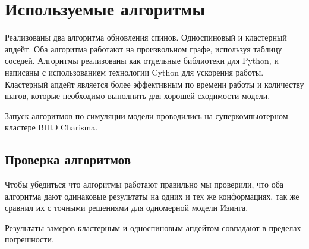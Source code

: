 \section{Используемые алгоритмы}

Реализованы два алгоритма обновления спинов. Односпиновый и кластерный апдейт. Оба алгоритма работают на произвольном графе, используя таблицу соседей. Алгоритмы реализованы как отдельные библиотеки для Python, и написаны с использованием технологии Cython для ускорения работы. Кластерный апдейт является более эффективным по времени работы и количеству шагов, которые необходимо выполнить для хорошей сходимости модели.

Запуск алгоритмов по симуляции модели проводились на суперкомпьютерном кластере ВШЭ Charisma. 

\subsection{Проверка алгоритмов}

Чтобы убедиться что алгоритмы работают правильно мы проверили, что оба алгоритма дают одинаковые результаты на одних и тех же конформациях, так же сравнил их с точными решениями для одномерной модели Изинга.

Результаты замеров кластерным и односпиновым апдейтом совпадают в пределах погрешности.

